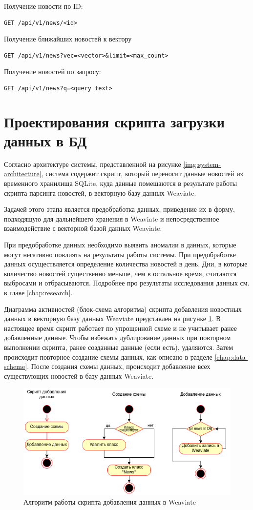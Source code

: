 Получение новости по ID:
\begin{lstlisting}
GET /api/v1/news/<id>
\end{lstlisting}


Получение ближайших новостей к вектору
\begin{lstlisting}
GET /api/v1/news?vec=<vector>&limit=<max_count>
\end{lstlisting}

Получение новостей по запросу:
\begin{lstlisting}
GET /api/v1/news?q=<query text>
\end{lstlisting}

\section{Проектирования скрипта загрузки данных в БД}

Согласно архитектуре системы, представленной на рисунке \ref{img:system-architecture}, система содержит скрипт, который переносит данные новостей из временного хранилища SQLite, куда данные помещаются в результате работы скрипта парсинга новостей, в векторную базу данных Weaviate.

Задачей этого этапа является предобработка данных, приведение их в форму, подходящую для дальнейшего хранения в Weaviate и непосредственное взаимодействие с векторной базой данных Weaviate.

При предобработке данных необходимо выявить аномалии в данных, которые могут негативно повлиять на результаты работы системы. При предобработке данных осуществляется определение количества новостей в день. Дни, в которые количество новостей существенно меньше, чем в остальное время, считаются выбросами и отбрасываются. Подробнее про результаты исследования данных см. в главе \ref{chap:research}.

Диаграмма активностей (блок-схема алгоритма) скрипта добавления новостных данных в векторную базу данных Weaviate представлен на рисунке \ref{img:add-script}. В настоящее время скрипт работает по упрощенной схеме и не учитывает ранее добавленные данные. Чтобы избежать дублирование данных при повторном выполнении скрипта, ранее созданные данные (если есть), удаляются. Затем происходит повторное создание схемы данных, как описано в разделе \ref{chap:data-scheme}. После создания схемы данных, происходит добавление всех существующих новостей в базу данных Weaviate.

\begin{figure}[h]
    \centering
    \includegraphics{images/add-script.png}
    \caption{Алгоритм работы скрипта добавления данных в Weaviate}
    \label{img:add-script}
\end{figure}
